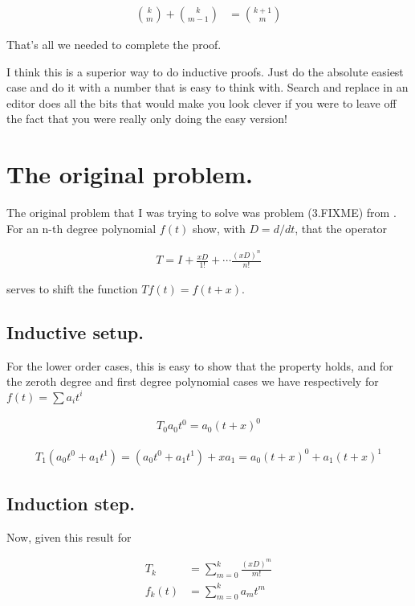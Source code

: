 \begin{align}
\binom{k}{m} + \binom{k}{m-1}
&=
\binom{k+1}{m}
\end{align}

That's all we needed to complete the proof.

I think this is a superior way to do inductive proofs.  Just do the absolute easiest case and do it with a number that is easy to think with.  Search and replace in an editor does all the bits that would make you look clever if you were to leave off the fact that you were really only doing the easy version!

\section{The original problem.}

The original problem that I was trying to solve was problem (3.FIXME) from \citep{byron1992mca}.  For an n-th degree polynomial $f(t)$
show, with $D = d/dt$, that the operator

\begin{align*}
T = I + \frac{xD}{1!} + \cdots \frac{(xD)^n}{n!}
\end{align*}

serves to shift the function $T f(t) = f(t + x)$.

\subsection{Inductive setup.}

For the lower order cases, this is easy to show that the property holds, and for the zeroth degree and first degree polynomial cases we have
respectively for $f(t) = \sum a_i t^i$

\begin{align*}
T_0 a_0 t^0 = a_0 (t + x)^0
\end{align*}

\begin{align*}
T_1 (a_0 t^0 + a_1 t^1) = (a_0 t^0 + a_1 t^1) + x a_1 = a_0(t + x)^0 + a_1(t + x)^1
\end{align*}

\subsection{Induction step.}

Now, given this result for 

\begin{align*}
T_k &= \sum_{m=0}^k \frac{(xD)^m}{m!} \\
f_k(t) &= \sum_{m=0}^k a_m t^m
\end{align*}

